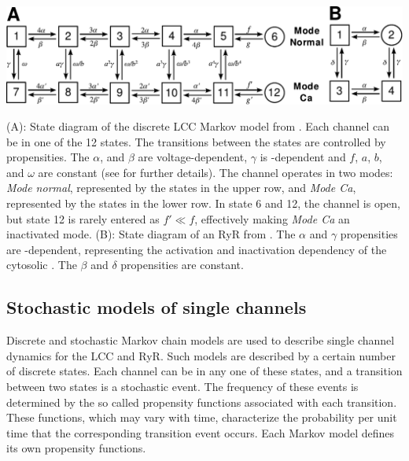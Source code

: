 \begin{figurewithlongcaption}
  \label{fig:hake:markov-models}
  \centering
  \includegraphics[height=\largefig]{chapters/hake/pdf/markov_models}
  \caption[Discrete markov models]{(A): State diagram of the
    discrete LCC Markov model from \citet{JafriRiceWinslow1998}. Each
    channel can be in one of the 12 states.  The transitions between
    the states are controlled by propensities. The $\alpha$, and
    $\beta$ are voltage-dependent, $\gamma$ is \CaC-dependent and $f$,
    $a$, $b$, and $\omega$ are constant (see
    \citet{JafriRiceWinslow1998} for further details). The channel
    operates in two modes: \textit{Mode normal}, represented by the
    states in the upper row, and \textit{Mode Ca}, represented by the
    states in the lower row. In state 6 and 12, the channel is open,
    but state 12 is rarely entered as $f'\ll{}f$, effectively making
    \textit{Mode Ca} an inactivated mode. (B): State diagram
    of an RyR from \citet{SternSongEtAl1999}. The $\alpha$ and
    $\gamma$ propensities are \Ca-dependent, representing the
    activation and inactivation dependency of the cytosolic \CaC. The
    $\beta$ and $\delta$ propensities are constant.}
\end{figurewithlongcaption}

\subsection{Stochastic models of single channels}
\label{sec:hake:stochastic-models}
   

Discrete and stochastic Markov chain models are used to describe
single channel dynamics for the LCC and RyR. Such models are described
by a certain number of discrete states. Each channel can be in any one
of these states, and a transition between two states is a stochastic
event. The frequency of these events is determined by the so called
propensity functions associated with each transition. These functions,
which may vary with time, characterize the probability per unit time
that the corresponding transition event occurs. Each Markov model
defines its own propensity functions.


